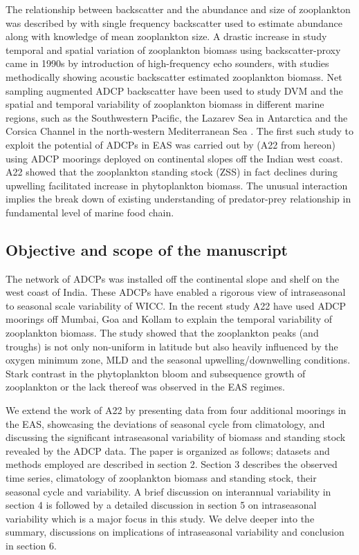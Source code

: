 \documentclass[authoryear,review,12pt]{elsarticle}
\begin{document}
    The relationship between backscatter and the abundance and size of zooplankton was described by \citet{greenlaw1979acoustical} with single frequency backscatter used to estimate abundance along with knowledge of mean zooplankton size. A drastic increase in study temporal and spatial variation of zooplankton biomass using  backscatter-proxy came in 1990s by introduction of high-frequency echo sounders, with studies \citep{flagg1989use, wiebe1990sound, batchelder00981, greene1998three, rippeth1998diur} methodically showing acoustic backscatter estimated zooplankton biomass.
	Net sampling augmented ADCP backscatter have been used to study DVM and the spatial and temporal variability of zooplankton biomass in different marine regions, such as the Southwestern Pacific, the Lazarev Sea in Antarctica and the Corsica Channel in the north-western Mediterranean Sea \citep{cisewski2010seasonal,hamilton2013links, smeti2015spatial, guerra2019zooplankton}. The first such study to exploit the potential of ADCPs in EAS was carried out by \citet{aparna2022seasonal} (A22 from hereon) using ADCP moorings deployed on continental slopes off the Indian west coast.	A22 showed that the zooplankton standing stock (ZSS) in fact declines during upwelling facilitated increase in phytoplankton biomass. The unusual interaction implies the break down of existing understanding of predator-prey relationship in fundamental level of marine food chain.
	
	\subsection{Objective and scope of the manuscript}
	
	 The network of ADCPs was installed off the continental slope and shelf on the west coast of India. These ADCPs have enabled a rigorous view of intraseasonal to seasonal scale variability \citep{amol2014observed, chaudhuri2020observed} of WICC. In the recent study A22 have used ADCP moorings off  Mumbai, Goa and Kollam to explain the temporal variability of zooplankton biomass. The study showed that the zooplankton peaks (and troughs) is not only non-uniform in latitude but also heavily influenced by the oxygen minimum zone, MLD and the seasonal upwelling/downwelling conditions. Stark contrast in the phytoplankton bloom and subsequence  growth of zooplankton or the lack thereof was observed in the EAS regimes.
	
    We extend the work of A22 by presenting data from four additional moorings in the EAS, showcasing the deviations of seasonal cycle from climatology, and discussing the significant intraseasonal variability of biomass and standing stock revealed by the ADCP data. The paper is organized as follows; datasets and methods employed are described in section 2. Section 3 describes the observed time series, climatology of zooplankton biomass and standing stock, their seasonal cycle and variability. A brief discussion on interannual variability in section 4 is followed by a detailed discussion in section 5 on intraseasonal variability which is a major focus in this study. We delve deeper into the summary, discussions on implications of intraseasonal variability and conclusion in section 6.
	
\end{document}
